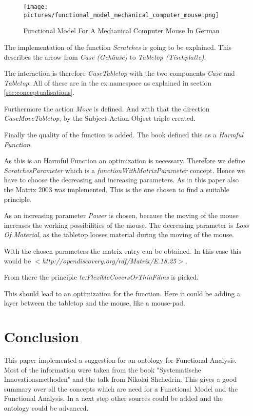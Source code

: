 \documentclass[11pt,a4paper]{article}
\begin{document}
\begin{figure}[ht]
  \centering
  \texttt{[image: pictures/functional\_model\_mechanical\_computer\_mouse.png]}
  \caption{Functional Model For A Mechanical Computer Mouse In German}
  \label{fig:functional_model_mechanical_computer_mouse}
\end{figure}

The implementation of the function \emph{Scratches} is going to be explained.
This describes the arrow from \emph{Case (Gehäuse)} to \emph{Tabletop
  (Tischplatte)}.

The interaction is therefore \emph{CaseTabletop} with the two components
\emph{Case} and \emph{Tabletop}.  All of these are in the ex namespace as
explained in section \ref{sec:conceptualisations}.

Furthermore the action \emph{Move} is defined.  And with that the direction
\emph{CaseMoveTabletop}, by the Subject-Action-Object triple created.

Finally the quality of the function is added.  The book defined this as a
\emph{Harmful Function}.

As this is an Harmful Function an optimization is necessary.  Therefore we
define \emph{ScratchesParameter} which is a \emph{functionWithMatrixParameter}
concept.  Hence we have to choose the decreasing and increasing parameters.
As in this paper also the Matrix 2003 was implemented.  This is the one chosen
to find a suitable principle.

As an increasing parameter \emph{Power} is chosen, because the moving of the
mouse increases the working possibilities of the mouse.  The decreasing
parameter is \emph{Loss Of Material}, as the tabletop looses material during
the moving of the mouse.

With the chosen parameters the matrix entry can be obtained.  In this case
this would be \emph{$<$http://opendiscovery.org/rdf/Matrix/E.18.25$>$}.

From there the principle \emph{tc:FlexibleCoversOrThinFilms} is picked.

This should lead to an optimization for the function.  Here it could be adding
a layer between the tabletop and the mouse, like a mouse-pad.

\section{Conclusion}
\label{sec:conclusion}

This paper implemented a suggestion for an ontology for Functional Analysis.
Most of the information were taken from the book "Systematische
Innovationsmethoden" and the talk from Nikolai Shchedrin.  This gives a good
summary over all the concepts which are need for a Functional Model and the
Functional Analysis.  In a next step other sources could be added and the
ontology could be advanced.
\end{document}
